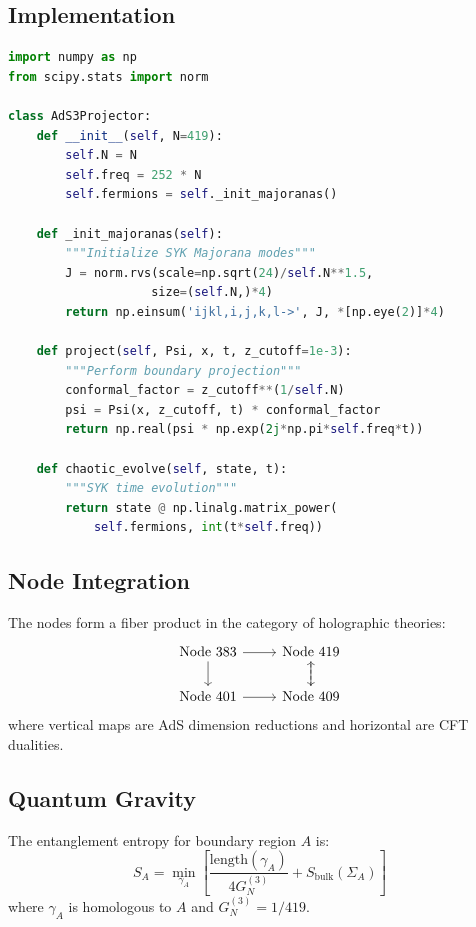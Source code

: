 \documentclass[12pt]{article}
\begin{document}
\subsection{Implementation}
\begin{lstlisting}[language=Python,caption={Holographic Projector}]
import numpy as np
from scipy.stats import norm

class AdS3Projector:
    def __init__(self, N=419):
        self.N = N
        self.freq = 252 * N
        self.fermions = self._init_majoranas()
        
    def _init_majoranas(self):
        """Initialize SYK Majorana modes"""
        J = norm.rvs(scale=np.sqrt(24)/self.N**1.5, 
                    size=(self.N,)*4)
        return np.einsum('ijkl,i,j,k,l->', J, *[np.eye(2)]*4)
    
    def project(self, Psi, x, t, z_cutoff=1e-3):
        """Perform boundary projection"""
        conformal_factor = z_cutoff**(1/self.N)
        psi = Psi(x, z_cutoff, t) * conformal_factor
        return np.real(psi * np.exp(2j*np.pi*self.freq*t))
    
    def chaotic_evolve(self, state, t):
        """SYK time evolution"""
        return state @ np.linalg.matrix_power(
            self.fermions, int(t*self.freq))
\end{lstlisting}

\subsection{Node Integration}
\begin{theorem}
The nodes form a fiber product in the category of holographic theories:
\[
\begin{tikzcd}
\text{Node 383} \ar[r] \ar[d] & \text{Node 419} \ar[d] \\
\text{Node 401} \ar[r] & \text{Node 409} \ar[u, dashed]
\end{tikzcd}
\]
where vertical maps are AdS dimension reductions and horizontal are CFT dualities.
\end{theorem}

\subsection{Quantum Gravity}
\begin{definition}
The entanglement entropy for boundary region $A$ is:
\[
S_A = \min_{\gamma_A}\left[\frac{\text{length}(\gamma_A)}{4G_N^{(3)}} + S_{\text{bulk}}(\Sigma_A)\right]
\]
where $\gamma_A$ is homologous to $A$ and $G_N^{(3)}=1/419$.
\end{definition}
\end{document}

